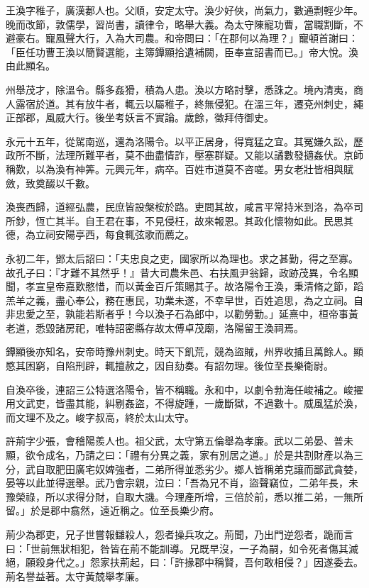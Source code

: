 \begin{pinyinscope}
王渙字稚子，廣漢郪人也。父順，安定太守。渙少好俠，尚氣力，數通剽輕少年。晚而改節，敦儒學，習尚書，讀律令，略舉大義。為太守陳寵功曹，當職割斷，不避豪右。寵風聲大行，入為大司農。和帝問曰：「在郡何以為理？」寵頓首謝曰：「臣任功曹王渙以簡賢選能，主簿鐔顯拾遺補闕，臣奉宣詔書而已。」帝大悅。渙由此顯名。

州舉茂才，除溫令。縣多姦猾，積為人患。渙以方略討擊，悉誅之。境內清夷，商人露宿於道。其有放牛者，輒云以屬稚子，終無侵犯。在溫三年，遷兗州刺史，繩正部郡，風威大行。後坐考妖言不實論。歲餘，徵拜侍御史。

永元十五年，從駕南巡，還為洛陽令。以平正居身，得寬猛之宜。其冤嫌久訟，歷政所不斷，法理所難平者，莫不曲盡情詐，壓塞群疑。又能以譎數發擿姦伏。京師稱歎，以為渙有神筭。元興元年，病卒。百姓市道莫不咨嗟。男女老壯皆相與賦斂，致奠醊以千數。

渙喪西歸，道經弘農，民庶皆設槃桉於路。吏問其故，咸言平常持米到洛，為卒司所鈔，恆亡其半。自王君在事，不見侵枉，故來報恩。其政化懷物如此。民思其德，為立祠安陽亭西，每食輒弦歌而薦之。

永初二年，鄧太后詔曰：「夫忠良之吏，國家所以為理也。求之甚勤，得之至寡。故孔子曰：『才難不其然乎！』昔大司農朱邑、右扶風尹翁歸，政跡茂異，令名顯聞，孝宣皇帝嘉歎愍惜，而以黃金百斤策賜其子。故洛陽令王渙，秉清脩之節，蹈羔羊之義，盡心奉公，務在惠民，功業未遂，不幸早世，百姓追思，為之立祠。自非忠愛之至，孰能若斯者乎！今以渙子石為郎中，以勸勞勤。」延熹中，桓帝事黃老道，悉毀諸房祀，唯特詔密縣存故太傅卓茂廟，洛陽留王渙祠焉。

鐔顯後亦知名，安帝時豫州刺史。時天下飢荒，競為盜賊，州界收捕且萬餘人。顯愍其困窮，自陷刑辟，輒擅赦之，因自劾奏。有詔勿理。後位至長樂衛尉。

自渙卒後，連詔三公特選洛陽令，皆不稱職。永和中，以劇令勃海任峻補之。峻擢用文武吏，皆盡其能，糾剔姦盜，不得旋踵，一歲斷獄，不過數十。威風猛於渙，而文理不及之。峻字叔高，終於太山太守。

許荊字少張，會稽陽羨人也。祖父武，太守第五倫舉為孝廉。武以二弟晏、普未顯，欲令成名，乃請之曰：「禮有分異之義，家有別居之道。」於是共割財產以為三分，武自取肥田廣宅奴婢強者，二弟所得並悉劣少。鄉人皆稱弟克讓而鄙武貪婪，晏等以此並得選舉。武乃會宗親，泣曰：「吾為兄不肖，盜聲竊位，二弟年長，未豫榮祿，所以求得分財，自取大譏。今理產所增，三倍於前，悉以推二弟，一無所留。」於是郡中翕然，遠近稱之。位至長樂少府。

荊少為郡吏，兄子世嘗報讎殺人，怨者操兵攻之。荊聞，乃出門逆怨者，跪而言曰：「世前無狀相犯，咎皆在荊不能訓導。兄既早沒，一子為嗣，如令死者傷其滅絕，願殺身代之。」怨家扶荊起，曰：「許掾郡中稱賢，吾何敢相侵？」因遂委去。荊名譽益著。太守黃兢舉孝廉。


\end{pinyinscope}
